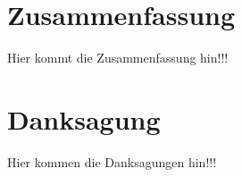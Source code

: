 \documentclass[twoside,12pt,a4paper]{report}
\begin{document}

\setcounter{page}{1}



\section*{Zusammenfassung}

Hier kommt die Zusammenfassung hin!!!
\newpage
\section*{Danksagung}

Hier kommen die Danksagungen hin!!!

\cleardoublepage


\renewcommand{\baselinestretch}{1.3}
\small\normalsize

\tableofcontents

\renewcommand{\baselinestretch}{1}
\small\normalsize

\cleardoublepage


\renewcommand{\baselinestretch}{1.3}
\small\normalsize

\listoffigures

\renewcommand{\baselinestretch}{1}
\small\normalsize

\cleardoublepage


\renewcommand{\baselinestretch}{1.3}
\small\normalsize

\listoftables
\end{document}
